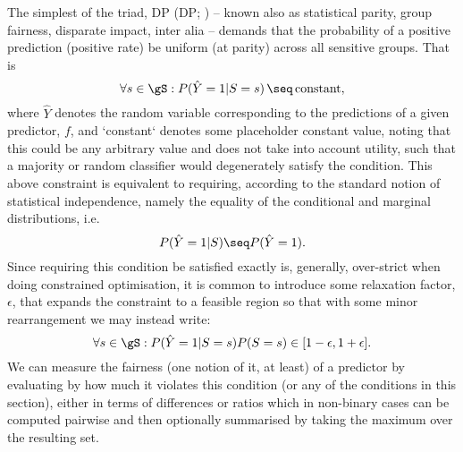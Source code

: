 %
The simplest of the triad, \acl{DP} (\acs{DP}; \citealp{zemel2013learning,
feldman2015certifying}) -- known also as statistical parity, group fairness, disparate impact,
inter alia -- demands that the probability of a positive prediction (positive rate) be uniform
(at parity) across all sensitive groups. 
%
That is
%
\begin{equation}
    \forall s \in \gS: P( \hat{Y} = 1 | S = s ) \,\seq\, \text{constant},
\end{equation}
%
where \(\hat{Y}\) denotes the random variable corresponding to the predictions of a given
predictor, \(f\), and `constant` denotes some placeholder constant value, noting that this could be
any arbitrary value and does not take into account utility, such that a majority or random
classifier would degenerately satisfy the condition. 
%
This above constraint is equivalent to requiring, according to the standard notion of statistical
independence, namely the equality of the conditional and marginal distributions, i.e.
%
\begin{equation}
    P( \hat{Y} = 1 | S) \seq P( \hat{Y} = 1 ).
\end{equation}
%
%
Since requiring this condition be satisfied exactly is, generally, over-strict when doing
constrained optimisation, it is common to introduce some relaxation factor, \(\epsilon\), that
expands the constraint to a feasible region so that with some minor rearrangement we may instead
write:
%
\begin{equation}
    \forall s \in \gS: P(\hat{Y}=1|S=s) P(S=s) \in [ 1 - \epsilon, 1 + \epsilon ]. 
%
\end{equation}
%
We can measure the fairness (one notion of it, at least) of a predictor by evaluating by how much
it violates this condition (or any of the conditions in this section), either in terms of
differences or ratios  which in non-binary cases can be computed pairwise and then optionally
summarised by taking the maximum over the resulting set.

